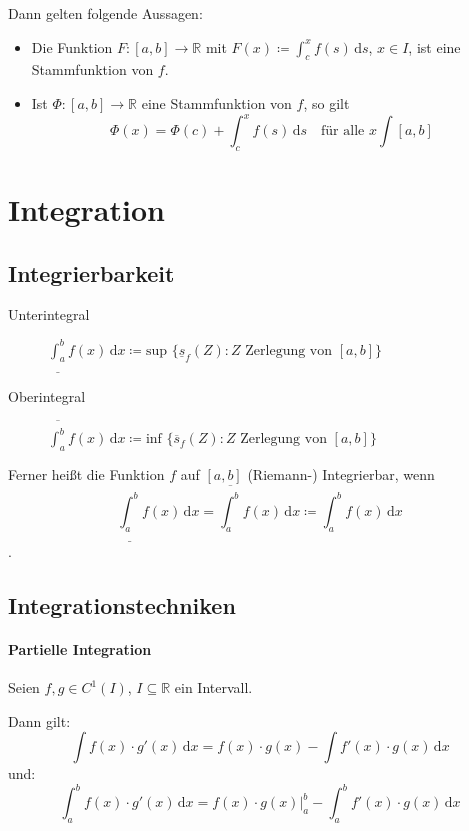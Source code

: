 			Dann gelten folgende Aussagen:
			\begin{itemize}
				\item Die Funktion $ F : [a, b] \rightarrow \mathbb{R} $ mit $ F(x) \coloneqq \int _ c ^ x \! f(s) \, \mathrm{d}s $, $ x \in I $, ist eine Stammfunktion von $ f $.
				\item Ist $ \Phi : [a, b] \rightarrow \mathbb{R} $ eine Stammfunktion von $ f $, so gilt \[ \Phi(x) = \Phi(c) + \int _ c ^ x \! f(s) \, \mathrm{d}s \quad\text{für alle } x \int [a, b] \]
			\end{itemize}

	\section{Integration}
		\subsection{Integrierbarkeit}
			\begin{description}
				\item[Unterintegral] $ \underline{\int _ a ^ b} \! f(x) \, \mathrm{d}x \coloneqq \text{sup } \{ \underline{s} _ f (Z) : Z \text{ Zerlegung von } [a, b] \} $
				\item[Oberintegral] $ \overline{\int _ a ^ b} \! f(x) \, \mathrm{d}x \coloneqq \text{inf } \{ \overline{s} _ f (Z) : Z \text{ Zerlegung von } [a, b] \} $
			\end{description}

			Ferner heißt die Funktion $ f $ auf $ [a, b] $ (Riemann-) Integrierbar, wenn \[ \underline{\int _ a ^ b} \! f(x) \, \mathrm{d}x = \overline{\int _ a ^ b} \! f(x) \, \mathrm{d}x \coloneqq \int _ a ^ b \! f(x) \, \mathrm{d}x \].

		\subsection{Integrationstechniken}
			\paragraph{Partielle Integration}
				Seien $ f, g \in C ^ 1 (I) $, $ I \subseteq \mathbb{R} $ ein Intervall.

				Dann gilt:
				\begin{equation*}
					\int \! f(x) \cdot g'(x) \, \mathrm{d}x = f(x) \cdot g(x) - \int \! f'(x) \cdot g(x) \, \mathrm{d}x
				\end{equation*}
				und:
				\begin{equation*}
					\int _ a ^ b \! f(x) \cdot g'(x) \, \mathrm{d}x = f(x) \cdot g(x) \Bigr| _ a ^ b - \int _ a ^ b \! f'(x) \cdot g(x) \, \mathrm{d}x
				\end{equation*}

